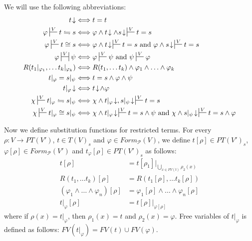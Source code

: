 \documentclass[reqno]{amsart}
\theoremstyle{definition}
\theoremstyle{remark}
\numberwithin{figure}{section}
\begin{document}
We will use the following abbreviations:
\begin{align*}
t\!\downarrow & \Longleftrightarrow t = t \\
\varphi \sststile{}{V} t \leftrightharpoons s & \Longleftrightarrow \varphi \land t\!\downarrow \land s\!\downarrow\,\sststile{}{V} t = s \\
\varphi \sststile{}{V} t \cong s & \Longleftrightarrow \varphi \land t\!\downarrow\,\sststile{}{V} t = s \text{ and } \varphi \land s\!\downarrow\,\sststile{}{V} t = s \\
\varphi \ssststile{}{V} \psi & \Longleftrightarrow \varphi \sststile{}{V} \psi \text{ and } \psi \sststile{}{V} \varphi \\
R(t_1|_{\varphi_1}, \ldots t_k|_{\varphi_k}) & \Longleftrightarrow R(t_1, \ldots t_k) \land \varphi_1 \land \ldots \land \varphi_k \\
t|_\varphi = s|_\psi & \Longleftrightarrow t = s \land \varphi \land \psi \\
t|_\varphi\!\downarrow & \Longleftrightarrow t\!\downarrow\!\land \varphi \\
\chi \sststile{}{V} t|_\varphi \leftrightharpoons s|_\psi & \Longleftrightarrow \chi \land t|_\varphi\!\downarrow, s|_\psi\!\downarrow\,\sststile{}{V} t = s \\
\chi \sststile{}{V} t|_\varphi \cong s|_\psi & \Longleftrightarrow \chi \land t|_\varphi\!\downarrow\,\sststile{}{V} t = s \land \psi \text{ and } \chi \land s|_\psi\!\downarrow\,\sststile{}{V} t = s \land \varphi
\end{align*}

Now we define substitution functions for restricted terms.
For every $\rho : V \to PT(V')$, $t \in T(V)_s$ and $\varphi \in Form_\mathcal{P}(V)$,
we define $t[\rho] \in PT(V')_s$, $\varphi[\rho] \in Form_\mathcal{P}(V')$ and $t_\varphi[\rho] \in PT(V')_s$ as follows:
\begin{align*}
t[\rho] & = t[\rho_1]|_{\bigcup_{x \in FV(t)} \rho_2(x)} \\
R(t_1, \ldots t_k)[\rho] & = R(t_1[\rho], \ldots t_k[\rho]) \\
(\varphi_1 \land \ldots \land \varphi_n)[\rho] & = \varphi_1[\rho] \land \ldots \land \varphi_n[\rho] \\
t|_\varphi[\rho] & = t[\rho]|_{\varphi[\rho]}
\end{align*}
where if $\rho(x) = t|_\varphi$, then $\rho_1(x) = t$ and $\rho_2(x) = \varphi$.
Free variables of $t|_\varphi$ is defined as follows: $FV(t|_\varphi) = FV(t) \cup FV(\varphi)$.
\end{document}
